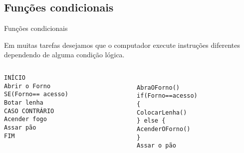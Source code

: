 \documentclass[handout]{beamer}
\begin{document}
\subsection{Funções condicionais}
\begin{frame}{Funções condicionais}

 Em muitas tarefas desejamos que o computador execute instruções diferentes dependendo de alguma condição lógica.
  
 \begin{columns}
   \begin{column}{6cm}
     \texttt{INÍCIO\\
       \hspace{10pt}   Abrir o Forno\\
       \hspace{10pt}   SE(Forno== acesso)\\
       \hspace{10pt}\hspace{10pt}       Botar lenha\\
       \hspace{10pt}   CASO CONTRÁRIO\\
       \hspace{10pt}\hspace{10pt}       Acender fogo\\
       \hspace{10pt}   Assar pão\\
       FIM\\}
   \end{column}
   \begin{column}{6cm}
  \texttt{ \\   AbraOForno()\\
      \hspace{10pt} if(Forno==acesso)\\
     \{\\
      \hspace{10pt} ColocarLenha()\\
      \} else \{\\
     \hspace{10pt} AcenderOForno()\\
 \}\\
Assar o pão}

   \end{column}
 \end{columns}
\end{frame}
\end{document}
